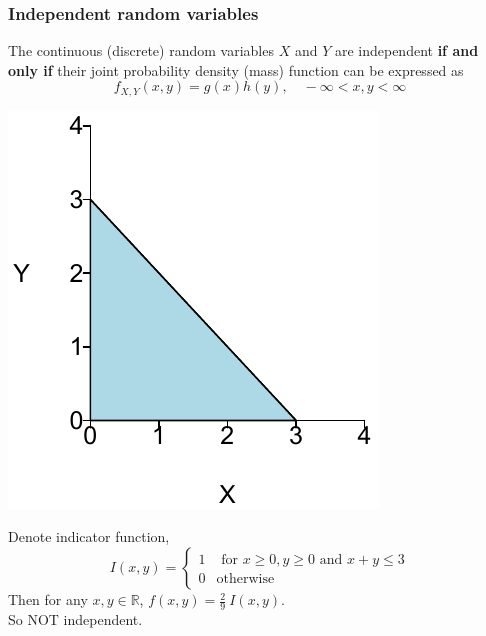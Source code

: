 \documentclass[slidestop,compress,mathserif]{beamer}
\begin{document}
\begin{frame}\frametitle{Independent random variables}

The continuous (discrete) random variables $X$ and $Y$ are independent {\bf if and only if}
their joint probability density (mass) function can be expressed as
\[f_{X, Y}(x, y) = g(x) h(y), \quad -\infty < x, y < \infty \]

\vfill

\end{frame}


\begin{frame}%
{
\begin{center}
    \includegraphics[width=\textwidth]{figures/triangle2.pdf}
\end{center}
}
{
\pause Denote indicator function,
\[ I(x,y) = \begin{cases}
    1 & \text{ for } x\geq 0, y \geq 0 \text{ and } x+y \leq 3 \\
    0           & \text{otherwise}
\end{cases}
 \]
\pause Then for any $x, y \in \mathbb{R}$,
$f(x, y) =  \frac{2}{9}~I(x, y)$. \\
\pause So NOT independent.\\
}
\end{frame}
\end{document}
